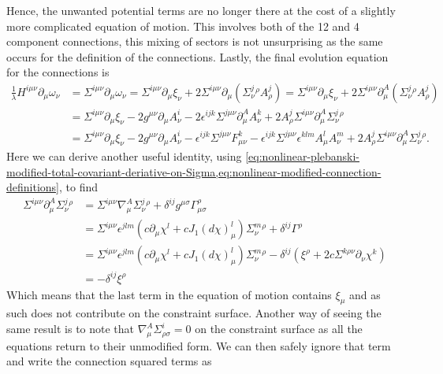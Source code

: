 \documentclass[10pt]{report}
\theoremstyle{definition}
\begin{document}
        Hence, the unwanted potential terms are no longer there at the cost of a slightly more complicated equation of motion. This involves both of the 12 and 4 component connections, this mixing of sectors is not unsurprising as the same occurs for the definition of the connections. Lastly, the final evolution equation for the connections is 
        \begin{align}
            \frac{1}{\lambda} H^{i\mu\nu} \partial_\mu \omega_\nu & = \Sigma^{i\mu\nu} \partial_\mu \omega_\nu = \Sigma^{i\mu\nu} \partial_\mu \xi_\nu + 2 \Sigma^{i\mu\nu} \partial_\mu \left( \Sigma^j_\nu{}^\rho A^j_\rho \right) = \Sigma^{i\mu\nu} \partial_\mu \xi_\nu + 2 \Sigma^{i\mu\nu} \partial^A_\mu \left( \Sigma^j_\nu{}^\rho A^j_\rho \right) \nonumber \\ & = \Sigma^{i\mu\nu} \partial_\mu \xi_\nu - 2 g^{\mu\nu} \partial_\mu A^i_\nu - 2\epsilon^{ijk} \Sigma^{j\mu\nu} \partial^A_\mu A^k_\nu + 2 A^j_\rho \Sigma^{i\mu\nu} \partial^A_\mu \Sigma^j_\nu{}^\rho \nonumber \\ & = \Sigma^{i\mu\nu} \partial_\mu \xi_\nu - 2g^{\mu\nu} \partial_\mu A^i_\nu - \epsilon^{ijk}\Sigma^{j\mu\nu} F^k_{\mu\nu} - \epsilon^{ijk} \Sigma^{j\mu\nu} \epsilon^{klm} A^l_\mu A^m_\nu + 2 A^j_\rho \Sigma^{i\mu\nu} \partial^A_\mu \Sigma^j_\nu{}^\rho.
        \end{align}
        Here we can derive another useful identity, using \cref{eq:nonlinear-plebanski-modified-total-covariant-deriative-on-Sigma,eq:nonlinear-modified-connection-definitions}, to find
        \begin{align}
            \Sigma^{i\mu\nu} \partial^A_\mu \Sigma^j_\nu{}^\rho & = \Sigma^{i\mu\nu} \nabla^A_\mu \Sigma^j_\nu{}^\rho + \delta^{ij} g^{\mu\sigma} \Gamma_{\mu\sigma}^\rho \nonumber \\ & = \Sigma^{i\mu\nu} \epsilon^{jlm} \left( c \partial_\mu \chi^l + c J_1(d\chi)^l_\mu \right) \Sigma^m_\nu{}^\rho + \delta^{ij} \Gamma^\rho \nonumber \\ & = \Sigma^{i\mu\nu} \epsilon^{jlm} \left( c \partial_\mu \chi^l + c J_1(d\chi)^l_\mu \right) \Sigma^m_\nu{}^\rho - \delta^{ij} (\xi^\rho + 2c \Sigma^{k\rho\nu} \partial_\nu \chi^k) \nonumber \\ & = -\delta^{ij} \xi^\rho
        \end{align}
        Which means that the last term in the equation of motion contains $\xi_\mu$ and as such does not contribute on the constraint surface. Another way of seeing the same result is to note that $\nabla^A_\mu \Sigma^i_{\rho\sigma} = 0$ on the constraint surface as all the equations return to their unmodified form. We can then safely ignore that term and write the connection squared terms as
\end{document}
